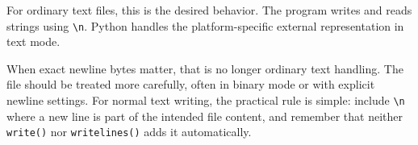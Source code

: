 For ordinary text files, this is the desired behavior. The program writes and reads strings using \texttt{\textbackslash n}. Python handles the platform-specific external representation in text mode.

When exact newline bytes matter, that is no longer ordinary text handling. The file should be treated more carefully, often in binary mode or with explicit newline settings. For normal text writing, the practical rule is simple: include \texttt{\textbackslash n} where a new line is part of the intended file content, and remember that neither \texttt{write()} nor \texttt{writelines()} adds it automatically.
